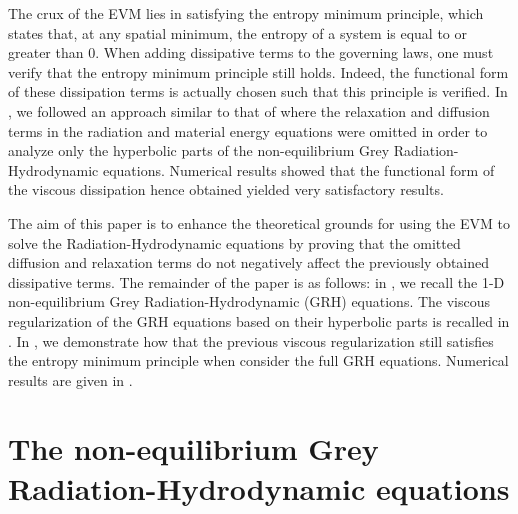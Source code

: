 \documentclass{mc2015}
\begin{document}
The crux of the EVM lies in satisfying the entropy minimum principle, which states that, at any spatial minimum, the entropy of a system is equal to or greater than 0. When
adding dissipative terms to the governing laws, one must verify that the entropy minimum principle still holds. Indeed, the functional form of these dissipation terms
is actually chosen such that this principle is verified. In \cite{our_jcp_radhy_paper}, we followed an approach similar to that of \cite{Balsara, LowrieMorel} 
where the relaxation and diffusion terms in the radiation and material energy equations were omitted in order to analyze only the hyperbolic parts of 
the non-equilibrium Grey Radiation-Hydrodynamic equations. Numerical results showed that the functional form of the viscous dissipation hence obtained 
yielded very satisfactory results. 

The aim of this paper is to enhance the theoretical grounds for using the EVM to solve the  Radiation-Hydrodynamic equations by proving that the omitted diffusion
and relaxation terms do not negatively affect the previously obtained dissipative terms. The remainder of the paper is as follows: in , we recall
the 1-D non-equilibrium Grey Radiation-Hydrodynamic (GRH) equations. The viscous regularization of the GRH equations based on their hyperbolic parts is recalled in .
In , we demonstrate how that the previous viscous regularization still satisfies the entropy minimum principle when consider the full GRH equations.
Numerical results are given in . 

\section{The non-equilibrium Grey Radiation-Hydrodynamic equations}\label{sec:GRH}
\end{document}
